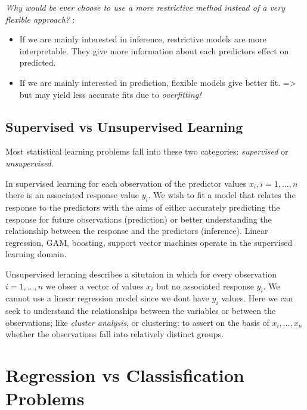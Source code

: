 \documentclass[
  letterpaper,
  DIV=11,
  numbers=noendperiod]{scrreprt}
\begin{document}
\emph{Why would be ever choose to use a more restrictive method instead
of a very flexible approach?} :

\begin{itemize}
\item
  If we are mainly interested in inference, restrictive models are more
  interpretable. They give more information about each predictors effect
  on predicted.
\item
  If we are mainly interested in prediction, flexible models give better
  fit. =\textgreater{} but may yield less accurate fits due to
  \emph{overfitting!}
\end{itemize}

\hypertarget{supervised-vs-unsupervised-learning}{%
\subsection{Supervised vs Unsupervised
Learning}\label{supervised-vs-unsupervised-learning}}

Most statistical learning problems fall into these two categories:
\emph{supervised} or \emph{unsupervised}.

In supervised learning for each observation of the predictor values
\(x_i, i = 1,\dots, n\) there is an associated response value \(y_i\).
We wish to fit a model that relates the response to the predictors with
the aims of either accurately predicting the response for future
observations (prediction) or better understanding the relationship
between the response and the predictors (inference). Linear regression,
GAM, boosting, support vector machines operate in the supervised
learning domain.

Unsupervised leraning describes a situtaion in which for every
observation \(i=1,\dots,n\) we obser a vector of values \(x_i\) but no
associated response \(y_i\). We cannot use a linear regression model
since we dont have \(y_i\) values. Here we can seek to understand the
relationships between the variables or between the observations; like
\emph{cluster analysis}, or clustering: to assert on the basis of
\(x_i,\dots,x_n\) whether the observations fall into relatively distinct
groups.

\hypertarget{regression-vs-classisfication-problems}{%
\section{Regression vs Classisfication
Problems}\label{regression-vs-classisfication-problems}}
\end{document}
